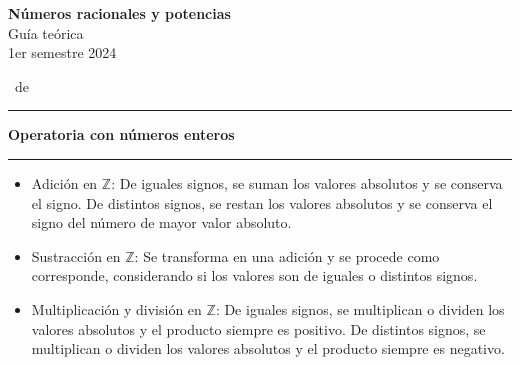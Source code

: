 \documentclass[spanish,letterpaper, 11pt, addpoints, answers]{exam}
\begin{document}

\begin{center}
\textbf{Números racionales y potencias} \\
Guía teórica\\
1er semestre 2024
\end{center}
\extraheadheight{-0.5in}

\runningheadrule \extraheadheight{0.15in}

\vspace{0.15in}
\runningheadrule \extraheadheight{0.14in}

\runningfooter{}
              {\thepage\ de \numpages}
              {}
\vspace{0.05in}

\nopointsinmargin
\setlength\linefillthickness{0.1pt}
\setlength\answerlinelength{0.1in}
\vspace{0.1in}
\hrule 

\vspace{0.1in}
\parbox{6in}{
\textbf{Operatoria con números enteros}}
\vspace{0.15in}
\hrule

\begin{itemize}
  \item Adición en $\mathbb{Z}$: De iguales signos, se suman los valores absolutos y se conserva el signo. De distintos signos, se restan los valores absolutos y se conserva el signo del número de mayor valor absoluto.
  \item Sustracción en $\mathbb{Z}$: Se transforma en una adición y se procede como corresponde, considerando si los valores son de iguales o distintos signos.
  \item Multiplicación y división en $\mathbb{Z}$: De iguales signos, se multiplican o dividen los valores absolutos y el producto siempre es positivo. De distintos signos, se multiplican o dividen los valores absolutos y el producto siempre es negativo.
\end{itemize}
\end{document}
